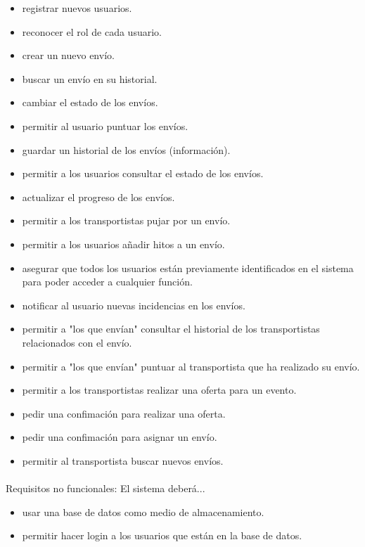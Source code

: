 \documentclass[10pt, a4paper,spanish]{article}
\begin{document}
			\begin{itemize}
				\item registrar nuevos usuarios.
				\item reconocer el rol de cada usuario.
				\item crear un nuevo envío.
				\item buscar un envío en su historial.
				\item cambiar el estado de los envíos.
				\item permitir al usuario puntuar los envíos.
				\item guardar un historial de los envíos (información).
				\item permitir a los usuarios consultar el estado de los envíos.
				\item actualizar el progreso de los envíos.
				\item permitir a los transportistas pujar por un envío.
				\item permitir a los usuarios añadir hitos a un envío.
				\item asegurar que todos los usuarios están previamente identificados en el sistema para poder acceder a cualquier función.
				\item notificar al usuario nuevas incidencias en los envíos.
				\item permitir a "los que envían" consultar el historial de los transportistas relacionados con el envío.
				\item permitir a "los que envían" puntuar al transportista que ha realizado su envío.
				\item permitir a los transportistas realizar una oferta para un evento.
				\item pedir una confimación para realizar una oferta.
				\item pedir una confimación para asignar un envío.
				\item permitir al transportista buscar nuevos envíos.
			\end{itemize}

			\paragraph{}
			Requisitos no funcionales: El sistema deberá...

				\begin{itemize}
					\item usar una base de datos como medio de almacenamiento.
					\item permitir hacer login a los usuarios que están en la base de datos.
				\end{itemize}
\end{document}
